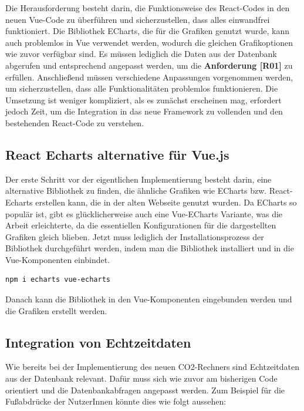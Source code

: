 Die Herausforderung besteht darin, die Funktionsweise des React-Codes in den neuen Vue-Code zu überführen und sicherzustellen, dass alles einwandfrei funktioniert. Die Bibliothek ECharts, die für die Grafiken genutzt wurde, kann auch problemlos in Vue verwendet werden, wodurch die gleichen Grafikoptionen wie zuvor verfügbar sind. Es müssen lediglich die Daten aus der Datenbank abgerufen und entsprechend angepasst werden, um die \textbf{Anforderung [R01]} zu erfüllen. Anschließend müssen verschiedene Anpassungen vorgenommen werden, um sicherzustellen, dass alle Funktionalitäten problemlos funktionieren. Die Umsetzung ist weniger kompliziert, als es zunächst erscheinen mag, erfordert jedoch Zeit, um die Integration in das neue Framework zu vollenden und den bestehenden React-Code zu verstehen.

\subsection{React Echarts alternative für Vue.js}

Der erste Schritt vor der eigentlichen Implementierung besteht darin, eine alternative Bibliothek zu finden, die ähnliche Grafiken wie ECharts bzw. React-Echarts erstellen kann, die in der alten Webseite genutzt wurden. Da ECharts so populär ist, gibt es glücklicherweise auch eine Vue-ECharts Variante, was die Arbeit erleichterte, da die essentiellen Konfigurationen für die dargestellten Grafiken gleich blieben. Jetzt muss lediglich der Installationsprozess der Bibliothek durchgeführt werden, indem man die Bibliothek installiert und in die Vue-Komponenten einbindet.

\begin{lstlisting}[language={bash}, caption={Installation von Vue-ECharts}]
npm i echarts vue-echarts
\end{lstlisting}

Danach kann die Bibliothek in den Vue-Komponenten eingebunden werden und die Grafiken erstellt werden. \cite{vue-echarts}

\subsection{Integration von Echtzeitdaten}

Wie bereits bei der Implementierung des neuen CO2-Rechners sind Echtzeitdaten aus der Datenbank relevant. Dafür muss sich wie zuvor am bisherigen Code orientiert und die Datenbankabfragen angepasst werden. Zum Beispiel für die Fußabdrücke der NutzerInnen könnte dies wie folgt aussehen:

